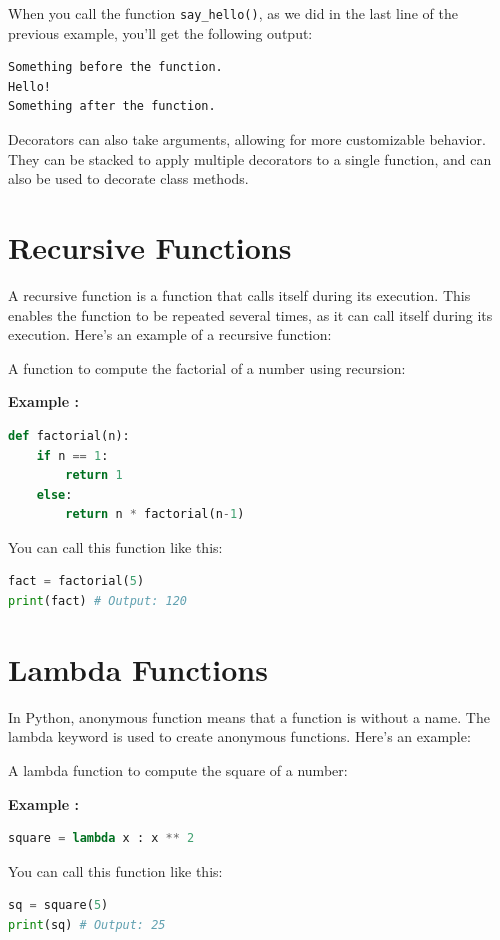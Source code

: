 \documentclass[12pt]{book}
\newtheorem{Example}{Example}[chapter]
\renewenvironment{Example}{\begin{trivlist}\item\relax
\textbf{Example \thesection: }}{\end{trivlist}}
\begin{document}
When you call the function \texttt{say\_hello()}, as we did in the last line of the previous example, you'll get the following output:

\begin{lstlisting}
Something before the function.
Hello!
Something after the function.
\end{lstlisting}

Decorators can also take arguments, allowing for more customizable behavior. They can be stacked to apply multiple decorators to a single function, and can also be used to decorate class methods.


\section{Recursive Functions}
A recursive function is a function that calls itself during its execution. This enables the function to be repeated several times, as it can call itself during its execution. Here's an example of a recursive function:


A function to compute the factorial of a number using recursion:
\begin{Example}
\begin{lstlisting}[language=Python]
def factorial(n):
	if n == 1:
		return 1
	else:
		return n * factorial(n-1)
\end{lstlisting}
You can call this function like this:
\begin{lstlisting}[language=Python]
fact = factorial(5)
print(fact) # Output: 120
\end{lstlisting}
\end{Example}

\section{Lambda Functions}
In Python, anonymous function means that a function is without a name. The lambda keyword is used to create anonymous functions. Here's an example:


A lambda function to compute the square of a number:
\begin{Example}
\begin{lstlisting}[language=Python]
square = lambda x : x ** 2
\end{lstlisting}
You can call this function like this:
\begin{lstlisting}[language=Python]
sq = square(5)
print(sq) # Output: 25
\end{lstlisting}
\end{Example}
\newpage
\end{document}
